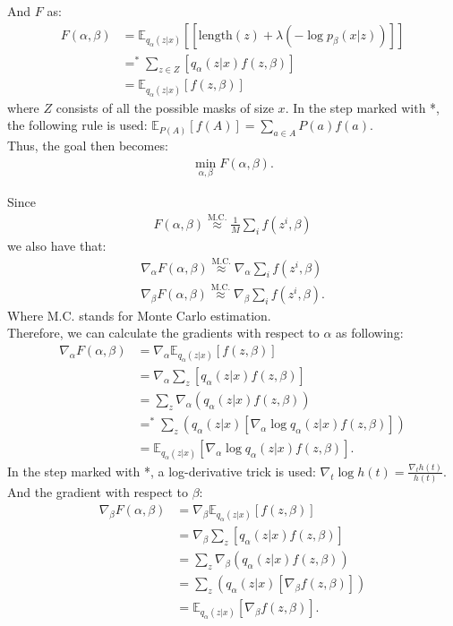 \documentclass[a4paper, 12pt]{report}
\newcommand{\approxtext}[1]{\ensuremath{\stackrel{\text{#1}}{\approx}}}
\begin{document}
\noindent And $F$ as:
\begin{align*}
    F(\alpha, \beta) &= \mathbb{E}_{q_{\alpha}(z|x)} [[\text{length}(z) + \lambda (-\log p_{\beta}(x|z))]] \\
    &=^{\ast} \sum_{z\in Z} [q_{\alpha}(z|x) f(z, \beta)] \\
    &= \mathbb{E}_{q_{\alpha}(z|x)}[f(z, \beta)]
\end{align*}
where $Z$ consists of all the possible masks of size $x$. In the step marked with *, the following rule is used: $\mathbb{E}_{P(A)}[f(A)] = \sum_{a \in A}P(a)f(a)$. \\

\noindent Thus, the goal then becomes:
\begin{align*}
    \min_{\alpha, \beta} F(\alpha, \beta).
\end{align*}

\noindent Since
\begin{align*}
    F(\alpha, \beta) \approxtext{M.C.} \frac{1}{M} \sum_i f(z^{i}, \beta)
\end{align*}
we also have that:
\begin{align*}
    \nabla_{\alpha} F(\alpha, \beta) \approxtext{M.C.} \nabla_{\alpha} \sum_i f(z^{i}, \beta) \\
    \nabla_{\beta} F(\alpha, \beta) \approxtext{M.C.} \nabla_{\beta} \sum_i f(z^{i}, \beta).
\end{align*}
Where M.C. stands for Monte Carlo estimation. \\

\noindent Therefore, we can calculate the gradients with respect to $\alpha$ as following:
\begin{align*}
    \nabla_{\alpha} F(\alpha, \beta) &= \nabla_{\alpha} \mathbb{E}_{q_{\alpha}(z|x)} [f(z, \beta)] \\
    &= \nabla_{\alpha} \sum_z [q_{\alpha}(z|x) f(z, \beta)] \\
    &= \sum_z \nabla_{\alpha} (q_{\alpha}(z|x) f(z, \beta)) \\
    &=^\ast \sum_z (q_{\alpha}(z|x) [\nabla_{\alpha} \log q_{\alpha}(z|x) f(z, \beta)]) \\
    &= \mathbb{E}_{q_{\alpha}(z|x)} [\nabla_{\alpha} \log q_{\alpha}(z|x) f(z, \beta)].
\end{align*}
In the step marked with *, a log-derivative trick is used: $\nabla_t \log h(t) = \frac{\nabla_t h(t)}{h(t)}$. \\

\noindent And the gradient with respect to $\beta$:
\begin{align*}
    \nabla_{\beta} F(\alpha, \beta) &= \nabla_{\beta} \mathbb{E}_{q_{\alpha}(z|x)}[f(z, \beta)] \\
    &= \nabla_{\beta} \sum_z [q_{\alpha}(z|x)f(z, \beta)] \\
    &= \sum_z \nabla_{\beta} (q_{\alpha}(z|x)f(z, \beta)) \\
    &= \sum_z (q_{\alpha}(z|x) [\nabla_{\beta} f(z, \beta)]) \\
    &= \mathbb{E}_{q_{\alpha}(z|x)} [\nabla_{\beta} f(z, \beta)].
\end{align*}
\end{document}
